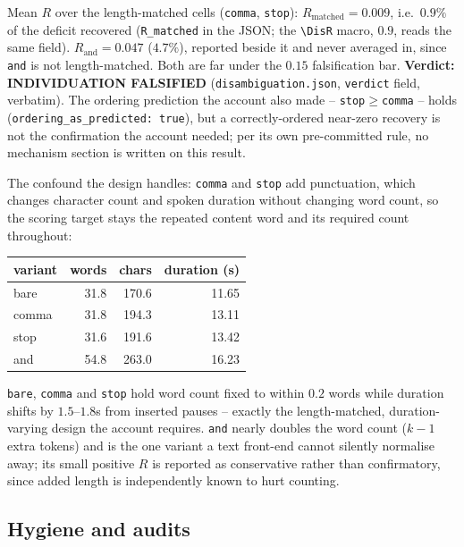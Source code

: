 \documentclass[11pt]{article}
\begin{document}
\noindent Mean $R$ over the length-matched cells (\texttt{comma}, \texttt{stop}):
$R_{\text{matched}}=0.009$, i.e.\ $0.9\%$ of the deficit recovered
(\texttt{R\_matched} in the JSON; the \texttt{\textbackslash DisR}
macro, $0.9$, reads the same field). $R_{\text{and}}=0.047$ ($4.7\%$), reported beside it and never
averaged in, since \texttt{and} is not length-matched. Both are far under the
$0.15$ falsification bar. \textbf{Verdict: INDIVIDUATION FALSIFIED}
(\texttt{disambiguation.json}, \texttt{verdict} field, verbatim). The ordering
prediction the account also made -- \texttt{stop}$\ge$\texttt{comma} -- holds
(\texttt{ordering\_as\_predicted: true}), but a correctly-ordered near-zero
recovery is not the confirmation the account needed; per its own
pre-committed rule, no mechanism section is written on this result.

The confound the design handles: \texttt{comma} and \texttt{stop} add
punctuation, which changes character count and spoken duration without
changing word count, so the scoring target stays the repeated content word
and its required count throughout:

\begin{center}
\begin{tabular}{@{}lrrr@{}}
\toprule
variant & words & chars & duration (s) \\
\midrule
bare  & 31.8 & 170.6 & 11.65 \\
comma & 31.8 & 194.3 & 13.11 \\
stop  & 31.6 & 191.6 & 13.42 \\
and   & 54.8 & 263.0 & 16.23 \\
\bottomrule
\end{tabular}
\end{center}

\noindent \texttt{bare}, \texttt{comma} and \texttt{stop} hold word count
fixed to within $0.2$ words while duration shifts by $1.5$--$1.8$s from
inserted pauses -- exactly the length-matched, duration-varying design the
account requires. \texttt{and} nearly doubles the word count ($k-1$ extra
tokens) and is the one variant a text front-end cannot silently normalise
away; its small positive $R$ is reported as conservative rather than
confirmatory, since added length is independently known to hurt counting.

\subsection{Hygiene and audits}
\end{document}
